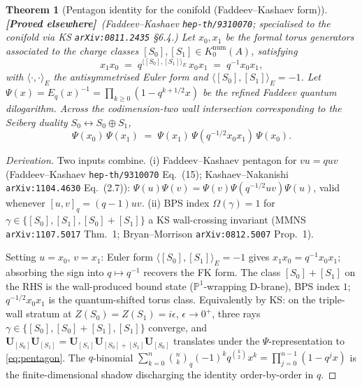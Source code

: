 \documentclass[11pt]{amsart}
\newtheorem{theorem}{Theorem}[section]
\theoremstyle{definition}
\providecommand{\bP}{\mathbb{P}}
\providecommand{\ClaimStatusProvedElsewhere}{\textbf{\textsf{[Proved elsewhere]}}}
\begin{document}
\begin{theorem}[Pentagon identity for the conifold (Faddeev--Kashaev form)]
\label{thm:pentagon}
\ClaimStatusProvedElsewhere\ \emph{(Faddeev--Kashaev
\texttt{hep-th/9310070}; specialised to the conifold via KS
\texttt{arXiv:0811.2435} §6.4.)}
Let $x_0, x_1$ be the formal torus generators associated to the
charge classes $[S_0], [S_1] \in K_0^{\mathrm{num}}(A)$, satisfying
\[
  x_1 x_0 \;=\; q^{\langle [S_0], [S_1]\rangle_E}\, x_0 x_1
  \;=\; q^{-1} x_0 x_1,
\]
with $\langle \cdot, \cdot\rangle_E$ the antisymmetrised Euler form
and $\langle [S_0], [S_1]\rangle_E = -1$. Let $\Psi(x) = E_q(x)^{-1}
= \prod_{k \geq 0} (1 - q^{k+1/2} x)$ be the refined Faddeev quantum
dilogarithm. Across the codimension-two wall intersection
corresponding to the Seiberg duality $S_0 \leftrightarrow S_0 \oplus
S_1$,
\begin{equation}\label{eq:pentagon}
  \Psi(x_0)\, \Psi(x_1)
  \;=\; \Psi(x_1)\, \Psi(q^{-1/2} x_0 x_1)\, \Psi(x_0).
\end{equation}
\end{theorem}

\begin{proof}[Derivation]
Two inputs combine. (i) Faddeev--Kashaev pentagon for $v u = q u v$
(Faddeev--Kashaev \texttt{hep-th/9310070} Eq.~(15); Kashaev--Nakanishi
\texttt{arXiv:1104.4630} Eq.~(2.7)): $\Psi(u) \Psi(v) = \Psi(v)
\Psi(q^{-1/2} u v) \Psi(u)$, valid whenever $[u, v]_q = (q-1) u v$.
(ii) BPS index $\Omega(\gamma) = 1$ for $\gamma \in \{[S_0], [S_1],
[S_0] + [S_1]\}$ a KS wall-crossing invariant (MMNS
\texttt{arXiv:1107.5017} Thm.~1; Bryan--Morrison
\texttt{arXiv:0812.5007} Prop.~1).

Setting $u = x_0$, $v = x_1$: Euler form $\langle [S_0], [S_1]
\rangle_E = -1$ gives $x_1 x_0 = q^{-1} x_0 x_1$; absorbing the sign
into $q \mapsto q^{-1}$ recovers the FK form. The class $[S_0] +
[S_1]$ on the RHS is the wall-produced bound state ($\bP^1$-wrapping
D-brane), BPS index $1$; $q^{-1/2} x_0 x_1$ is the quantum-shifted
torus class. Equivalently by KS: on the triple-wall stratum at
$Z(S_0) = Z(S_1) = i\epsilon$, $\epsilon \to 0^+$, three rays
$\gamma \in \{[S_0], [S_0]+[S_1], [S_1]\}$ converge, and
$\mathbf{U}_{[S_0]} \mathbf{U}_{[S_1]} = \mathbf{U}_{[S_1]}
\mathbf{U}_{[S_0]+[S_1]} \mathbf{U}_{[S_0]}$ translates under the
$\Psi$-representation to \eqref{eq:pentagon}. The $q$-binomial
$\sum_{k=0}^n \binom{n}{k}_q (-1)^k q^{\binom{k}{2}} x^k =
\prod_{j=0}^{n-1}(1 - q^j x)$ is the finite-dimensional shadow
discharging the identity order-by-order in $q$.
\end{proof}
\end{document}
